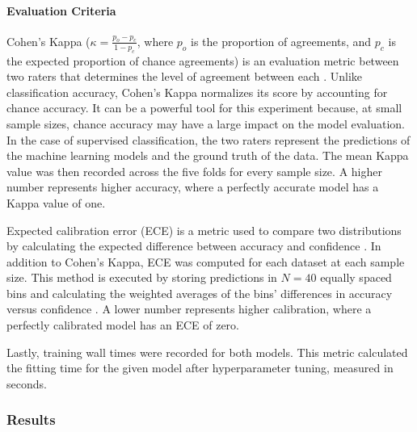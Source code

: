 \paragraph{Evaluation Criteria}
Cohen's Kappa ($\kappa = \frac{p_o - p_c}{1 - p_c}$, where $p_o$ is the proportion of agreements, and $p_c$ is the expected proportion of chance agreements) is an evaluation metric between two raters that determines the level of agreement between each \citep{cohen}.
Unlike classification accuracy, Cohen's Kappa normalizes its score by accounting for chance accuracy. It can be a powerful tool for this experiment because, at small sample sizes, chance accuracy may have a large impact on the model evaluation. In the case of supervised classification, the two raters represent the predictions of the machine learning models and the ground truth of the data. The mean Kappa value was then recorded across the five folds for every sample size. A higher number represents higher accuracy, where a perfectly accurate model has a Kappa value of one.

Expected calibration error (ECE) is a metric used to compare two distributions by calculating the expected difference between accuracy and confidence \citep{naeini2015obtaining}. In addition to Cohen's Kappa, ECE was computed for each dataset at each sample size. 
This method is executed by storing predictions in $N = 40$ equally spaced bins and calculating the weighted averages of the bins' differences in accuracy versus confidence \citep{pmlr-v70-guo17a}.
A lower number represents higher calibration, where a perfectly calibrated model has an ECE of zero.

Lastly, training wall times were recorded for both models. This metric calculated the fitting time for the given model after hyperparameter tuning, measured in seconds.

\subsubsection{Results}

